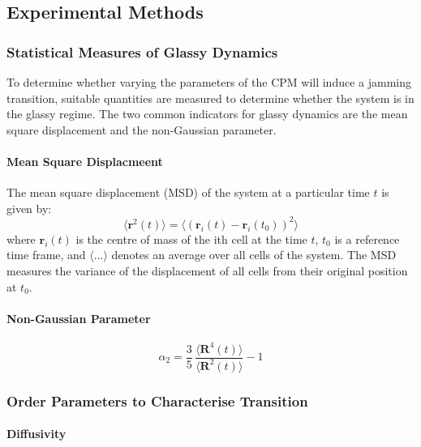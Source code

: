 \documentclass[a4paper,12pt]{article}
\begin{document}
\subsection{Experimental Methods}
\subsubsection{Statistical Measures of Glassy Dynamics}
To determine whether varying the parameters of the CPM will induce a jamming transition, suitable quantities are measured to determine whether the system is in the glassy regime. The two common indicators for glassy dynamics are the mean square displacement and the non-Gaussian parameter.

\paragraph{Mean Square Displacmeent}
The mean square displacement (MSD) of the system at a particular time $t$ is given by:
\begin{equation}
\langle{\bm{r}^2(t)\rangle} = \langle{\left(\bm{r}_i(t) - \bm{r}_i(t_0)\right)^2\rangle}
\end{equation}
where $\bm{r}_i (t)$ is the centre of mass of the ith cell at the time $t$, $t_0$ is a reference time frame, and $\langle...\rangle$ denotes an average over all cells of the system. The MSD measures the variance of the displacement of all cells from their original position at $t_0$. 

\paragraph{Non-Gaussian Parameter}

\begin{equation}
\alpha_2 = \frac{3}{5}\,\frac{\langle{\bm{R}^4(t)\rangle}}{\langle{\bm{R}^2(t)\rangle}} - 1
\end{equation}

\subsubsection{Order Parameters to Characterise Transition}
\paragraph{Diffusivity}
\end{document}
